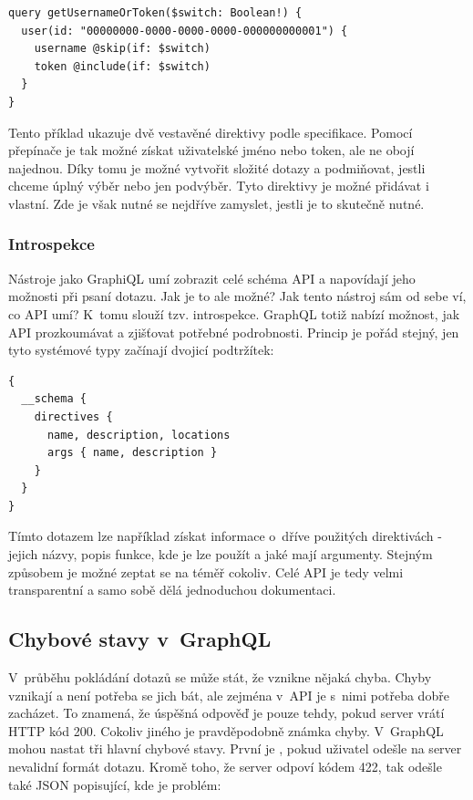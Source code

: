 \begin{verbatim}
query getUsernameOrToken($switch: Boolean!) {
  user(id: "00000000-0000-0000-0000-000000000001") {
    username @skip(if: $switch)
    token @include(if: $switch)
  }
}
\end{verbatim}

Tento příklad ukazuje dvě vestavěné direktivy podle specifikace. Pomocí přepínače je tak možné získat uživatelské jméno nebo token, ale ne obojí najednou. Díky tomu je možné vytvořit složité dotazy a podmiňovat, jestli chceme úplný výběr nebo jen podvýběr. Tyto direktivy je možné přidávat i vlastní. Zde je však nutné se nejdříve zamyslet, jestli je to skutečně nutné.

\subsubsection{Introspekce}
Nástroje jako GraphiQL \cite{graphiql} umí zobrazit celé schéma API a napovídají jeho možnosti při psaní dotazu. Jak je to ale možné? Jak tento nástroj sám od sebe ví, co API umí? K~tomu slouží tzv. introspekce. GraphQL totiž nabízí možnost, jak API prozkoumávat a zjišťovat potřebné podrobnosti. Princip je pořád stejný, jen tyto systémové typy začínají dvojicí podtržítek:

\begin{verbatim}
{
  __schema {
    directives {
      name, description, locations
      args { name, description }
    }
  }
}
\end{verbatim}

Tímto dotazem lze například získat informace o~dříve použitých direktivách - jejich názvy, popis funkce, kde je lze použít a jaké mají argumenty. Stejným způsobem je možné zeptat se na téměř cokoliv. Celé API je tedy velmi transparentní a samo sobě dělá jednoduchou dokumentaci.

\subsection{Chybové stavy v~GraphQL}
V~průběhu pokládání dotazů se může stát, že vznikne nějaká chyba. Chyby vznikají a není potřeba se jich bát, ale zejména v~API je s~nimi potřeba dobře zacházet. To znamená, že úspěšná odpověď je pouze tehdy, pokud server vrátí HTTP kód 200. Cokoliv jiného je pravděpodobně známka chyby. V~GraphQL mohou nastat tři hlavní chybové stavy. První je , pokud uživatel odešle na server nevalidní formát dotazu. Kromě toho, že server odpoví kódem 422, tak odešle také JSON popisující, kde je problém:

